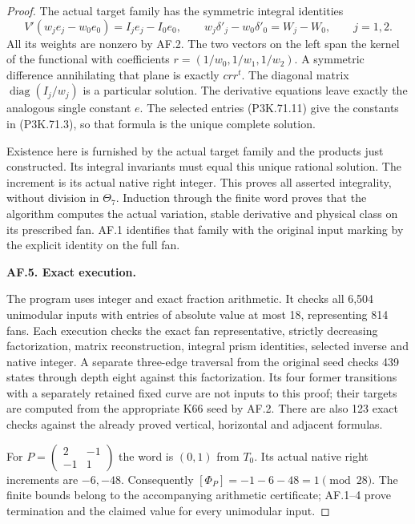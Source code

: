 \begin{proof}
The actual target family has the symmetric integral identities
\[
 V'(w_je_j-w_0e_0)=I_je_j-I_0e_0,\qquad
 w_j\delta'_j-w_0\delta'_0=W_j-W_0,\qquad j=1,2.
                                                            \tag{P3K.71.12}
\]
All its weights are nonzero by AF.2. The two vectors on the
left span the kernel of the functional with coefficients
\(r=(1/w_0,1/w_1,1/w_2)\). A symmetric difference
annihilating that plane is exactly \(c rr^t\). The diagonal
matrix \(\operatorname{diag}(I_j/w_j)\) is a particular
solution. The derivative equations leave exactly the analogous
single constant \(e\). The selected entries (P3K.71.11)
give the constants in (P3K.71.3), so that formula is the
unique complete solution.

Existence here is furnished by the actual target family and
the products just constructed. Its integral invariants must
equal this unique rational solution. The increment is its
actual native right integer. This proves all asserted
integrality, without division in \(\Theta_7\). Induction
through the finite word proves that the algorithm computes
the actual variation, stable derivative and physical class
on its prescribed fan. AF.1 identifies that family with the
original input marking by the explicit identity on the full fan.

\par\medskip\noindent\textbf{AF.5. Exact execution.}\par\nopagebreak[4]

The program  uses
integer and exact fraction arithmetic. It checks all 6,504
unimodular inputs with entries of absolute value at most 18,
representing 814 fans. Each execution checks the exact fan
representative, strictly decreasing factorization, matrix
reconstruction, integral prism identities, selected inverse
and native integer. A separate three-edge traversal from
the original seed checks 439 states through depth eight
against this factorization. Its four former transitions
with a separately retained fixed curve are not inputs to
this proof; their targets are computed from the appropriate
K66 seed by AF.2. There are also 123 exact checks against
the already proved vertical, horizontal and adjacent formulas.

For \(P=(\begin{smallmatrix}2&-1\\-1&1\end{smallmatrix})\)
the word is \((0,1)\) from \(T_0\). Its actual native right
increments are \(-6,-48\). Consequently
\([\Phi_P]=-1-6-48=1\pmod{28}\). The finite bounds belong
to the accompanying arithmetic certificate; AF.1--4 prove
termination and the claimed value for every unimodular input.
\end{proof}

